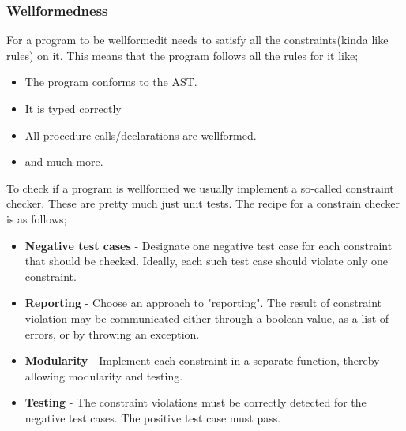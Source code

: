 \documentclass[tikz, border=5mm]{article}
\begin{document}
            \subsubsection{Wellformedness}
                For a program to be \gls{wellformed}it needs to satisfy all the constraints(kinda like rules) on it. This means that the program follows all the rules 
                for it like; 
                \begin{itemize}
                    \item The program conforms to the AST.
                    \item It is typed correctly
                    \item All procedure calls/declarations are wellformed.
                    \item and much more.
                \end{itemize}
                To check if a program is wellformed we usually implement a so-called constraint checker. These are pretty much just unit tests.
                The recipe for a constrain checker is as follows;
                \begin{itemize}
                    \item \textbf{Negative test cases} - Designate one negative test case for each constraint that should be checked. 
                    Ideally, each such test case should violate only one constraint.
                    \item \textbf{Reporting} - Choose an approach to "reporting". The result of constraint violation may be communicated either through
                                            a boolean value, as a list of errors, or by throwing an exception.
                    \item \textbf{Modularity} - Implement each constraint in a separate function, thereby allowing modularity and testing.
                    \item \textbf{Testing} - The constraint violations must be correctly detected for the negative test cases. The positive test case must pass.
                \end{itemize}
\end{document}
